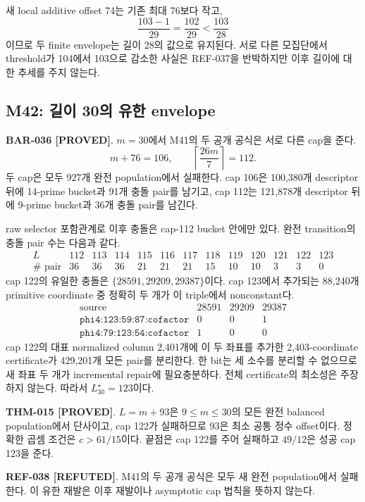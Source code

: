 \documentclass[11pt]{article}
\newcommand{\claimstatus}[2]{\textbf{#1 [#2]}}
\begin{document}
새 local additive offset 74는 기존 최대 76보다 작고,
\[
\frac{103-1}{29}=\frac{102}{29}<\frac{103}{28}
\]
이므로 두 finite envelope는 길이 28의 값으로 유지된다. 서로 다른
모집단에서 threshold가 104에서 103으로 감소한 사실은 REF-037을
반박하지만 이후 길이에 대한 추세를 주지 않는다.

\subsection{M42: 길이 30의 유한 envelope}

\claimstatus{BAR-036}{PROVED}.
\(m=30\)에서 M41의 두 공개 공식은 서로 다른 cap을 준다.
\[
m+76=106,\qquad
\left\lceil\frac{26m}{7}\right\rceil=112.
\]
두 cap은 모두 927개 완전 population에서 실패한다. cap 106은
100,380개 descriptor 뒤에 14-prime bucket과 91개 충돌 pair를
남기고, cap 112는 121,878개 descriptor 뒤에 9-prime bucket과
36개 충돌 pair를 남긴다.

raw selector 포함관계로 이후 충돌은 cap-112 bucket 안에만 있다.
완전 transition의 충돌 pair 수는 다음과 같다.
\[
\begin{array}{c|rrrrrrrrrrrr}
L&112&113&114&115&116&117&118&119&120&121&122&123\\
\hline
\#\text{ pair}&36&36&36&21&21&21&15&10&10&3&3&0
\end{array}
\]
cap 122의 유일한 충돌은
\(\{28591,29209,29387\}\)이다. cap 123에서 추가되는 88,240개
primitive coordinate 중 정확히 두 개가 이 triple에서 nonconstant다.
\[
\begin{array}{c|rrr}
\text{source}&28591&29209&29387\\
\hline
\texttt{phi4:123:59:87:cofactor}&0&0&1\\
\texttt{phi4:79:123:54:cofactor}&1&0&0
\end{array}
\]
cap 122의 대표 normalized column 2,401개에 이 두 좌표를 추가한
2,403-coordinate certificate가 429,201개 모든 pair를 분리한다.
한 bit는 세 소수를 분리할 수 없으므로 새 좌표 두 개가 incremental
repair에 필요충분하다. 전체 certificate의 최소성은 주장하지 않는다.
따라서 \(L_{30}^{\star}=123\)이다.

\claimstatus{THM-015}{PROVED}.
\(L=m+93\)은 \(9\le m\le30\)의 모든 완전 balanced population에서
단사이고, cap 122가 실패하므로 93은 최소 공통 정수 offset이다.
정확한 곱셈 조건은 \(c>61/15\)이다. 끝점은 cap 122를 주어 실패하고
\(49/12\)은 성공 cap 123을 준다.

\claimstatus{REF-038}{REFUTED}.
M41의 두 공개 공식은 모두 새 완전 population에서 실패한다. 이 유한
재발은 이후 재발이나 asymptotic cap 법칙을 뜻하지 않는다.
\end{document}
